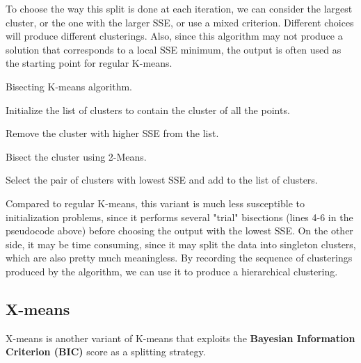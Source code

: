 To choose the way this split is done at each iteration, we can consider the largest cluster, or the one with the larger SSE, or use a mixed criterion. Different choices will produce different clusterings. Also, since this algorithm may not produce a solution that corresponds to a local SSE minimum, the output is often used as the starting point for regular K-means.

\begin{algorithm}
\caption{Bisecting K-means algorithm.}
\begin{algorithmic}[1]

    \State Initialize the list of clusters to contain the cluster of all the points.

    \Repeat
        \State Remove the cluster with higher SSE from the list.

            \State Bisect the cluster using 2-Means.
        \EndFor
        
    \State Select the pair of clusters with lowest SSE and add to the list of clusters.
\end{algorithmic}
\end{algorithm}

Compared to regular K-means, this variant is much less susceptible to initialization problems, since it performs several "trial" bisections (lines 4-6 in the pseudocode above) before choosing the output with the lowest SSE. On the other side, it may be time consuming, since it may split the data into singleton clusters, which are also pretty much meaningless. By recording the sequence of clusterings produced by the algorithm, we can use it to produce a hierarchical clustering.

\subsection{X-means}

X-means is another variant of K-means that exploits the \textbf{Bayesian Information Criterion (BIC)} score as a splitting strategy.


